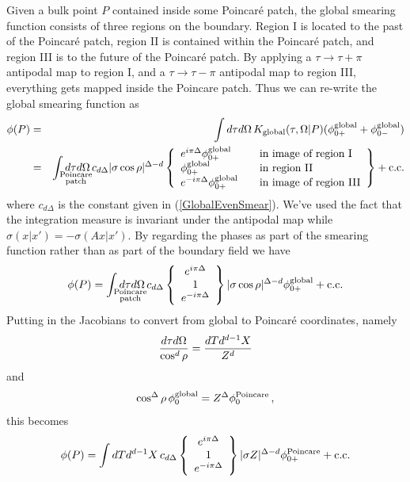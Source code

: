 \documentclass[12pt]{article}
\begin{document}
Given a bulk point $P$ contained inside some Poincar\'e patch, the
global smearing function consists of three regions on the boundary.
Region I is located to the past of the Poincar\'e patch, region II is
contained within the Poincar\'e patch, and region III is to the future
of the Poincar\'e patch.  By applying a $\tau \rightarrow \tau + \pi$
antipodal map to region I, and a $\tau \rightarrow \tau - \pi$
antipodal map to region III, everything gets mapped inside the
Poincare patch.  Thus we can re-write the global smearing function as
\begin{eqnarray*}
\phi(P) & = & \int d\tau d\Omega \, K_{\rm global}(\tau,\Omega \vert P) (\phi_{0+}^{\rm global} + \phi_{0-}^{\rm global}) \\
& = & \int_{{\scriptstyle \rm Poincare} \atop {\scriptstyle \rm patch}} \hspace{-1cm} d\tau d\Omega \,
c_{d\Delta} \vert \sigma \cos \rho \vert^{\Delta - d}
\left\lbrace \begin{array}{ll}
e^{i \pi \Delta}  \phi_{0+}^{\rm global} & \quad \hbox{\rm in image of region I} \\
                  \phi_{0+}^{\rm global} & \quad \hbox{\rm in region II} \\
e^{-i \pi \Delta} \phi_{0+}^{\rm global} & \quad \hbox{\rm in image of region III}
\end{array}\right\rbrace + {\rm c.c.}
\end{eqnarray*}
where $c_{d\Delta}$ is the constant given in (\ref{GlobalEvenSmear}).
We've used the fact that the integration measure is invariant under
the antipodal map while $\sigma(x \vert x') = - \sigma(Ax \vert x')$.
By regarding the phases as part of the smearing function rather than
as part of the boundary field we have
\[
\phi(P) = \int_{{\scriptstyle \rm Poincare} \atop {\scriptstyle \rm patch}} \hspace{-1cm} d\tau d\Omega \, c_{d\Delta}
\left\lbrace\begin{array}{c}
e^{i \pi \Delta} \\
1 \\
e^{-i \pi \Delta}
\end{array}\right\rbrace
\vert \sigma \cos \rho \vert^{\Delta - d}
\phi_{0+}^{\rm global} + {\rm c.c.}
\]
Putting in the Jacobians to convert from global to Poincar\'e coordinates, namely
\[
{d\tau d\Omega \over \cos^d \rho} = {dT d^{d-1} X \over Z^d}
\]
and
\[
\cos^\Delta \rho \, \phi_0^{\rm global} = Z^\Delta \phi_0^{\rm Poincare}\,,
\]
this becomes
\begin{equation}
\label{Poincare1}
\phi(P) = \int dT d^{d-1}X \, c_{d\Delta}
\left\lbrace\begin{array}{c}
e^{i \pi \Delta} \\
1 \\
e^{-i \pi \Delta}
\end{array}\right\rbrace
\vert \sigma Z \vert^{\Delta - d}
\phi_{0+}^{\rm Poincare} + {\rm c.c.}
\end{equation}
\end{document}

